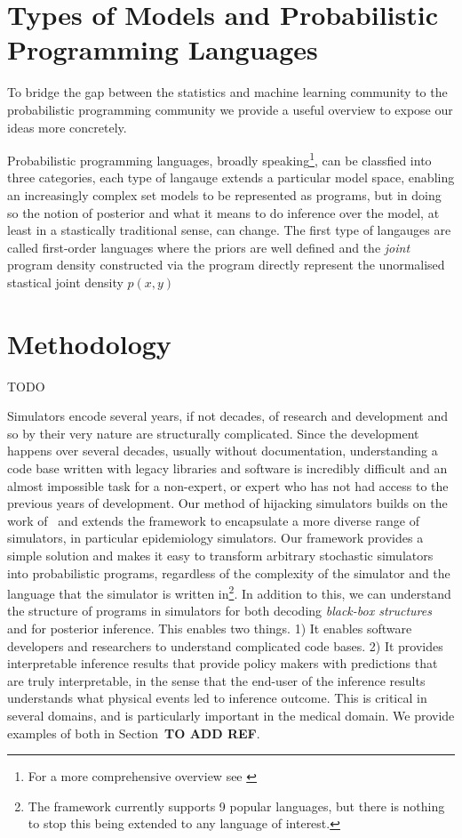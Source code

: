\documentclass{article}
\begin{document}
\section{Types of Models and Probabilistic Programming Languages}

To bridge the gap between the statistics and machine learning community to the probabilistic programming community we provide a useful overview to expose our ideas more concretely. 

Probabilistic programming languages, broadly speaking\footnote{For a more comprehensive overview see \cite{rainforth2017automating}}, can be classfied into three categories, each type of langauge extends a particular model space, enabling an increasingly complex set models to be represented as programs, but in doing so the notion of posterior and what it means to do inference over the model, at least in a stastically traditional sense, can change.
The first type of langauges are called first-order languages where the priors are well defined and the \textit{joint} program density constructed via the program directly represent the unormalised stastical joint density $p(x,y)$
\section{Methodology}
 TODO



Simulators encode several years, if not decades, of research and development and so by their very nature are structurally complicated. Since the development happens over several decades, usually without documentation, understanding a code base written with legacy libraries and software is incredibly difficult and an almost impossible task for a non-expert, or expert who has not had access to the previous years of development. Our method of hijacking simulators builds on the work of~\cite{baydin2018efficient} and extends the framework to encapsulate a more diverse range of simulators, in particular epidemiology simulators. Our framework provides a simple solution and makes it easy to transform arbitrary stochastic simulators into probabilistic programs, regardless of the complexity of the simulator and the language that the simulator is written in\footnote{The framework currently supports 9 popular languages, but there is nothing to stop this being extended to any language of interest.}. In addition to this, we can understand the structure of programs in simulators for both decoding \emph{black-box structures} and for posterior inference. This enables two things. 1) It enables software developers and researchers to understand complicated code bases. 2) It provides interpretable inference results that provide policy makers with predictions that are truly interpretable, in the sense that the end-user of the inference results understands what physical events led to inference outcome. This is critical in several domains, and is particularly important in the medical domain. We provide examples of both in Section~\textbf{TO ADD REF}.
\end{document}
